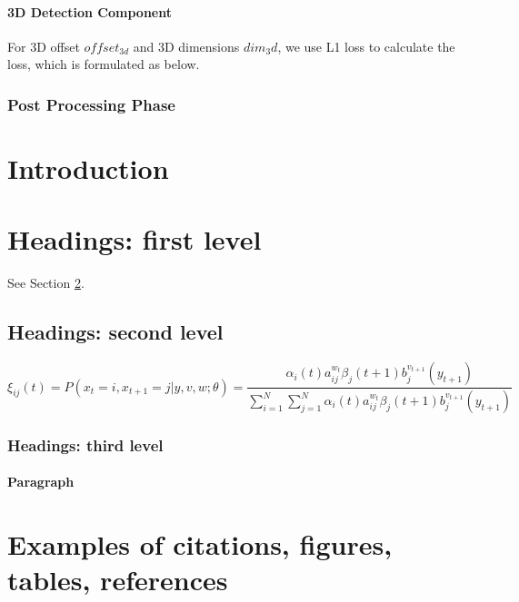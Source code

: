 \documentclass{article}
\begin{document}
\paragraph{3D Detection Component}
For 3D offset $offset_{3d}$ and 3D dimensions $dim_3d$, we use L1 loss to calculate the loss, which is formulated as below.




\subsubsection{Post Processing Phase}\label{post_processing}


\section{Introduction}
\lipsum[2]
\lipsum[3]


\section{Headings: first level}
\label{sec:headings}

\lipsum[4] See Section \ref{sec:headings}.

\subsection{Headings: second level}
\lipsum[5]
\begin{equation}
	\xi _{ij}(t)=P(x_{t}=i,x_{t+1}=j|y,v,w;\theta)= {\frac {\alpha _{i}(t)a^{w_t}_{ij}\beta _{j}(t+1)b^{v_{t+1}}_{j}(y_{t+1})}{\sum _{i=1}^{N} \sum _{j=1}^{N} \alpha _{i}(t)a^{w_t}_{ij}\beta _{j}(t+1)b^{v_{t+1}}_{j}(y_{t+1})}}
\end{equation}

\subsubsection{Headings: third level}
\lipsum[6]

\paragraph{Paragraph}
\lipsum[7]



\section{Examples of citations, figures, tables, references}
\label{sec:others}
\end{document}
